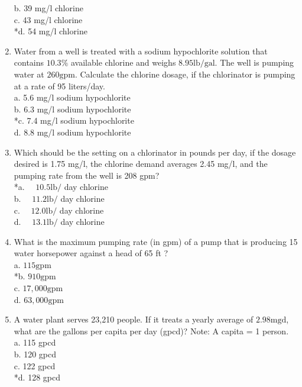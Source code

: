 \begin{enumerate}
b. 39 mg/l chlorine\\
c. 43 mg/l chlorine\\
*d. 54 mg/l chlorine \\
\item Water from a well is treated with a sodium hypochlorite solution that contains $10.3 \%$ available chlorine and weighs $8.95 \mathrm{lb} / \mathrm{gal}$. The well is pumping water at $260 \mathrm{gpm}$. Calculate the chlorine dosage, if the chlorinator is pumping at a rate of 95 liters/day.\\
a. 5.6 mg/l sodium hypochlorite\\
b. 6.3 mg/l sodium hypochlorite\\
*c. 7.4 mg/l sodium hypochlorite\\
d. 8.8 mg/l sodium hypochlorite\\
\item Which should be the setting on a chlorinator in pounds per day, if the dosage desired is 1.75 mg/l, the chlorine demand averages 2.45 mg/l, and the pumping rate from the well is 208 gpm?\\
*a. $\quad 10.5 \mathrm{lb} /$ day chlorine\\
b. $\quad 11.2 \mathrm{lb} /$ day chlorine\\
c. $\quad 12.0 \mathrm{lb} /$ day chlorine\\
d. $\quad 13.1 \mathrm{lb} /$ day chlorine\\
\item What is the maximum pumping rate (in gpm) of a pump that is producing 15 water horsepower against a head of 65 ft ?\\
a. $115 \mathrm{gpm}$\\
*b. $910 \mathrm{gpm}$\\
c. $17,000 \mathrm{gpm}$\\
d. $63,000 \mathrm{gpm}$\\
\item A water plant serves 23,210 people. If it treats a yearly average of $2.98 \mathrm{mgd}$, what are the gallons per capita per day (gpcd)? Note: A capita = 1 person.\\
a. 115 gpcd\\
b. 120 gpcd\\
c. 122 gpcd\\
*d. 128 gpcd\\
\end{enumerate}
